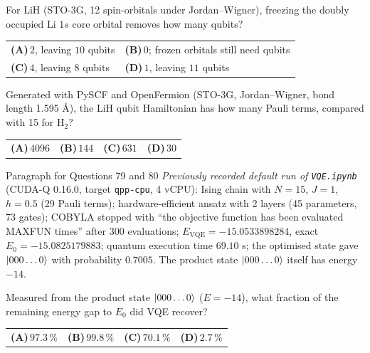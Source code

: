 \documentclass[11pt,a4paper]{article}
\newcommand{\optlabel}[1]{\textbf{(#1)}}
\newenvironment{qitem}[1]{\begin{list}{}{\setlength{\leftmargin}{3.3em}\setlength{\labelwidth}{3.1em}%
  \setlength{\labelsep}{0.2em}\setlength{\topsep}{3pt}\setlength{\parsep}{3pt}}\item[\textbf{Q.#1}\hfill]}{\end{list}}
\newcommand{\qsep}{\par\vspace{2pt}{\color{black!15}\hrule}\vspace{4pt}}
\begin{document}
\begin{qitem}{77}
For LiH (STO-3G, 12 spin-orbitals under Jordan--Wigner), freezing the doubly occupied Li $1s$ core orbital removes how many qubits?
\par\smallskip\noindent\begin{tabularx}{\linewidth}{@{}*{2}{L}@{}}
\optlabel{A}\,$2$, leaving $10$ qubits & \optlabel{B}\,$0$; frozen orbitals still need qubits \\[3pt]
\optlabel{C}\,$4$, leaving $8$ qubits & \optlabel{D}\,$1$, leaving $11$ qubits
\end{tabularx}
\end{qitem}
\qsep

\begin{qitem}{78}
Generated with PySCF and OpenFermion (STO-3G, Jordan--Wigner, bond length 1.595 \AA), the LiH qubit Hamiltonian has how many Pauli terms, compared with
15 for H$_2$?
\par\smallskip\noindent\begin{tabularx}{\linewidth}{@{}*{4}{L}@{}}
\optlabel{A}\,$4096$ & \optlabel{B}\,$144$ & \optlabel{C}\,$631$ & \optlabel{D}\,$30$
\end{tabularx}
\end{qitem}
\qsep

\begin{passagebox}{Paragraph for Questions 79 and 80}
\emph{Previously recorded default run of \texttt{VQE.ipynb}} (CUDA-Q 0.16.0, target \texttt{qpp-cpu}, 4 vCPU): Ising chain with $N = 15$, $J = 1$,
$h = 0.5$ (29 Pauli terms); hardware-efficient ansatz with 2 layers (45 parameters, 73 gates); COBYLA stopped with ``the objective function has
been evaluated MAXFUN times'' after 300 evaluations; $E_{\mathrm{VQE}} = -15.0533898284$, exact $E_0 = -15.0825179883$; quantum execution time
$69.10$ s; the optimised state gave $\ket{000\dots0}$ with probability $0.7005$. The product state $\ket{000\dots0}$ itself has energy $-14$.
\end{passagebox}
\begin{qitem}{79}
Measured from the product state $\ket{000\dots0}$ ($E = -14$), what fraction of the remaining energy gap to $E_0$ did VQE recover?
\par\smallskip\noindent\begin{tabularx}{\linewidth}{@{}*{4}{L}@{}}
\optlabel{A}\,$97.3\,\%$ & \optlabel{B}\,$99.8\,\%$ & \optlabel{C}\,$70.1\,\%$ & \optlabel{D}\,$2.7\,\%$
\end{tabularx}
\end{qitem}
\qsep
\end{document}
